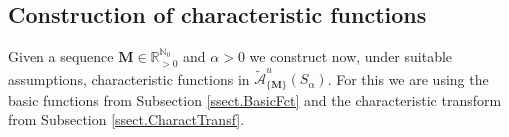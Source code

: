 \documentclass[11pt,a4paper]{article}
\theoremstyle{plain}
\theoremstyle{definition}
\newcommand{\RR}{\mathbb{R}}
\newcommand{\NN}{\mathbb{N}}
\newcommand{\red}[1]{{\color{red}#1}}
\newcommand{\M}{\mathbf{M}}
\newcommand{\LL}{\mathbf{L}}
\newcommand{\G}{\mathbf{G}}
\begin{document}
\subsection{Construction of characteristic functions}\label{ssect.ConstrCharactFunct}
Given a sequence $\M\in\RR_{>0}^{\NN_0}$ and $\alpha>0$ we construct now, under suitable assumptions, characteristic functions in $\widetilde{\mathcal{A}}^u_{\{\M\}} (S_{\alpha})$.
For this we are using the basic functions from Subsection \ref{ssect.BasicFct} and the characteristic transform from Subsection \ref{ssect.CharactTransf}.%
%
%
%



\end{document}
